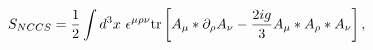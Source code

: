 \begin{equation}
  S_{NCCS} = \frac{1}{2} \int d^3 x~ \epsilon^{\mu \rho \nu}
  {\rm tr} \left[
    A_\mu \ast \partial_\rho A_\nu
    - \frac{2ig}{3} A_\mu \ast A_\rho \ast A_\nu
  \right],
\end{equation}

